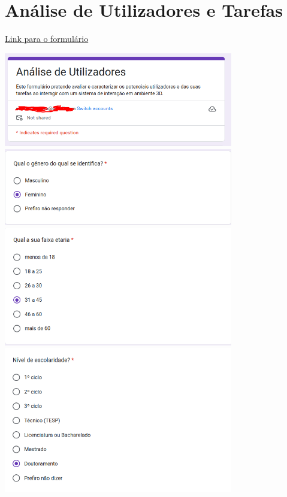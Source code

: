 \documentclass[a4paper,12pt]{article}
\begin{document}
\newpage
\section{Análise de Utilizadores e Tarefas}

\begin{center}
    \href{https://forms.gle/mGgTZJcjzfStsLvn6}{Link para o formulário}

    \vspace{0.3cm}
    \includegraphics[width=0.75\textwidth]{form/intro_form.png}
    \includegraphics[width=0.75\textwidth]{form/01questao_genero.png}
    \includegraphics[width=0.75\textwidth]{form/02questao_idade.png}
    \includegraphics[width=0.75\textwidth]{form/03questao_escolaridade.png}

\end{center}
\end{document}
